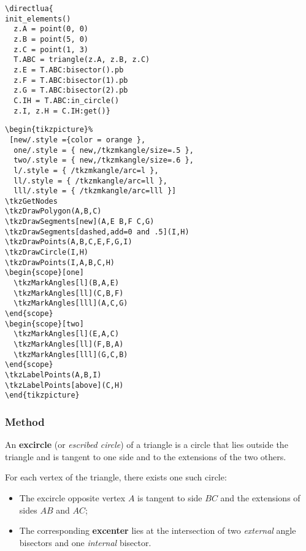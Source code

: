 \begin{minipage}{.5\textwidth}
\begin{verbatim}
\directlua{
init_elements()
  z.A = point(0, 0)
  z.B = point(5, 0)
  z.C = point(1, 3)
  T.ABC = triangle(z.A, z.B, z.C)
  z.E = T.ABC:bisector().pb
  z.F = T.ABC:bisector(1).pb
  z.G = T.ABC:bisector(2).pb
  C.IH = T.ABC:in_circle()
  z.I, z.H = C.IH:get()}
\end{verbatim}
\end{minipage}
\begin{minipage}{.5\textwidth}
\begin{verbatim}
\begin{tikzpicture}%
 [new/.style ={color = orange },
  one/.style = { new,/tkzmkangle/size=.5 },
  two/.style = { new,/tkzmkangle/size=.6 },
  l/.style = { /tkzmkangle/arc=l },
  ll/.style = { /tkzmkangle/arc=ll },
  lll/.style = { /tkzmkangle/arc=lll }]
\tkzGetNodes
\tkzDrawPolygon(A,B,C)
\tkzDrawSegments[new](A,E B,F C,G)
\tkzDrawSegments[dashed,add=0 and .5](I,H)
\tkzDrawPoints(A,B,C,E,F,G,I)
\tkzDrawCircle(I,H)
\tkzDrawPoints(I,A,B,C,H)
\begin{scope}[one]
  \tkzMarkAngles[l](B,A,E)
  \tkzMarkAngles[ll](C,B,F)
  \tkzMarkAngles[lll](A,C,G)
\end{scope}
\begin{scope}[two]
  \tkzMarkAngles[l](E,A,C)
  \tkzMarkAngles[ll](F,B,A)
  \tkzMarkAngles[lll](G,C,B)
\end{scope}
\tkzLabelPoints(A,B,I)
\tkzLabelPoints[above](C,H)
\end{tikzpicture}
\end{verbatim}
\end{minipage}

\subsubsection{Method } %
\label{ssub:method_triangle_ex__circle}

An \textbf{excircle} (or \emph{escribed circle}) of a triangle is a circle that lies outside the triangle and is tangent to one side and to the extensions of the two others.

\medskip
\noindent
For each vertex of the triangle, there exists one such circle:
\begin{itemize}
  \item The excircle opposite vertex $A$ is tangent to side $BC$ and the extensions of sides $AB$ and $AC$;
  \item The corresponding \textbf{excenter} lies at the intersection of two \emph{external} angle bisectors and one \emph{internal} bisector.
\end{itemize}

